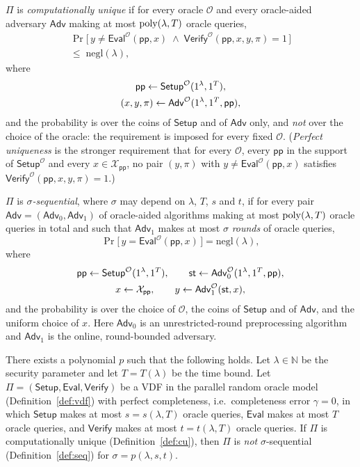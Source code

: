 \documentclass{aicr-conjecture}
\newcommand{\RO}{\mathcal{O}}
\newcommand{\Setup}{\mathsf{Setup}}
\newcommand{\Eval}{\mathsf{Eval}}
\newcommand{\Verify}{\mathsf{Verify}}
\newcommand{\Adv}{\mathsf{Adv}}
\newcommand{\pp}{\mathsf{pp}}
\newcommand{\stt}{\mathsf{st}}
\newcommand{\Xpp}{\mathcal{X}_{\pp}}
\newcommand{\negl}{\mathrm{negl}}
\begin{document}
\begin{definition}\label{def:cu}
$\Pi$ is \emph{computationally unique} if for every oracle $\RO$ and every
oracle-aided adversary $\Adv$ making at most $\mathrm{poly}(\lambda, T)$ oracle
queries,
\begin{multline*}
  \Pr\bigl[\, y \ne \Eval^{\RO}(\pp, x) \;\wedge\;
    \Verify^{\RO}(\pp, x, y, \pi) = 1 \,\bigr] \\
  \le\; \negl(\lambda),
\end{multline*}
where
\begin{gather*}
  \pp \sample \Setup^{\RO}(1^{\lambda}, 1^{T}), \\
  (x, y, \pi) \sample \Adv^{\RO}(1^{\lambda}, 1^{T}, \pp),
\end{gather*}
and the probability is over the coins of $\Setup$ and of $\Adv$ only, and
\emph{not} over the choice of the oracle: the requirement is imposed for
every fixed $\RO$. (\emph{Perfect uniqueness} is the stronger requirement
that for every $\RO$, every $\pp$ in the support of $\Setup^{\RO}$ and
every $x \in \Xpp$, no pair $(y, \pi)$ with $y \ne \Eval^{\RO}(\pp, x)$
satisfies $\Verify^{\RO}(\pp, x, y, \pi) = 1$.)
\end{definition}

\begin{definition}\label{def:seq}
$\Pi$ is \emph{$\sigma$-sequential}, where $\sigma$ may depend on
$\lambda$, $T$, $s$ and $t$, if for every pair
$\Adv = (\Adv_{0}, \Adv_{1})$ of oracle-aided algorithms making at most
$\mathrm{poly}(\lambda, T)$ oracle queries in total and such that $\Adv_{1}$ makes
at most $\sigma$ \emph{rounds} of oracle queries,
\[
  \Pr\bigl[\, y = \Eval^{\RO}(\pp, x) \,\bigr] = \negl(\lambda),
\]
where
\begin{gather*}
  \pp \sample \Setup^{\RO}(1^{\lambda}, 1^{T}), \qquad
  \stt \sample \Adv_{0}^{\RO}(1^{\lambda}, 1^{T}, \pp), \\
  x \sample \Xpp, \qquad
  y \sample \Adv_{1}^{\RO}(\stt, x),
\end{gather*}
and the probability is over the choice of $\RO$, the coins of $\Setup$ and
of $\Adv$, and the uniform choice of $x$. Here $\Adv_{0}$ is an
unrestricted-round preprocessing algorithm and $\Adv_{1}$ is the online,
round-bounded adversary.
\end{definition}

\begin{conjecture}\label{conj:main}
There exists a polynomial $p$ such that the following holds. Let
$\lambda \in \mathbb{N}$ be the security parameter and let
$T = T(\lambda)$ be the time bound. Let $\Pi = (\Setup, \Eval, \Verify)$
be a VDF in the parallel random oracle model (Definition~\ref{def:vdf})
with perfect completeness, i.e.\ completeness error $\gamma = 0$, in which
$\Setup$ makes at most $s = s(\lambda, T)$ oracle queries, $\Eval$ makes at
most $T$ oracle queries, and $\Verify$ makes at most $t = t(\lambda, T)$
oracle queries. If $\Pi$ is computationally unique
(Definition~\ref{def:cu}), then $\Pi$ is \emph{not} $\sigma$-sequential
(Definition~\ref{def:seq}) for $\sigma = p(\lambda, s, t)$.
\end{conjecture}
\end{document}

